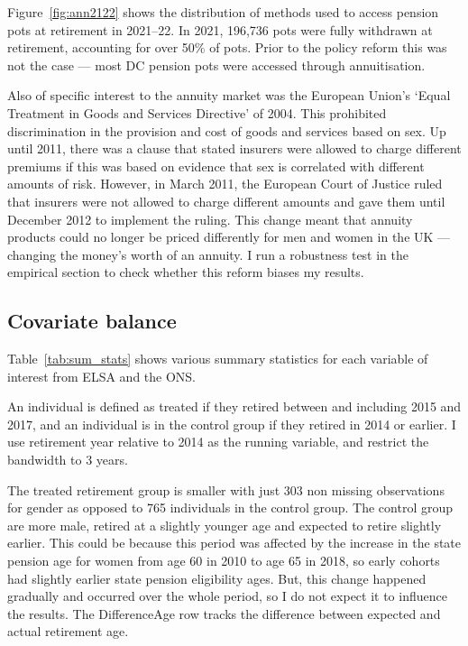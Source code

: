 \documentclass[12pt]{article}
\begin{document}
Figure~\ref{fig:ann2122} shows the distribution of methods used to access pension pots
at retirement in 2021--22. In 2021, 196,736 pots were fully withdrawn at
retirement, accounting for over 50\% of pots. Prior to the policy reform this
was not the case --- most DC pension pots were accessed through
annuitisation.

Also of specific interest to the annuity market was the European Union's `Equal
Treatment in Goods and Services Directive' of 2004. This prohibited
discrimination in the provision and cost of goods and services based on sex. Up
until 2011, there was a clause that stated insurers were allowed to charge
different premiums if this was based on evidence that sex is correlated with
different amounts of risk. However, in March 2011, the European Court of Justice
ruled that insurers were not allowed to charge different amounts and gave them
until December 2012 to implement the ruling. This change meant that annuity
products could no longer be priced differently for men and women in the UK ---
changing the money's worth of an annuity. I run a robustness test in the
empirical section to check whether this reform biases my results.



\subsection{Covariate balance}

Table~\ref{tab:sum_stats} shows various summary statistics for each variable of interest from ELSA and the ONS.

An individual is defined as treated if they retired between and including 2015 and 2017, and an individual is in the control group if they retired in 2014 or earlier. I use retirement year relative to 2014 as the running variable, and restrict the bandwidth to 3 years.

The treated retirement group is smaller with just 303 non missing observations for gender as opposed to 765 individuals in the control group.
The control group are more male, retired at a slightly younger age and expected to retire slightly earlier.
This could be because this period was affected by the increase in the
state pension age for women from age 60 in 2010 to age 65 in 2018, so early cohorts had slightly earlier state pension eligibility ages.
But, this change happened gradually and occurred over the whole period, so I do not expect it to influence the results.
The DifferenceAge row tracks the difference between expected and actual retirement age.
\end{document}
